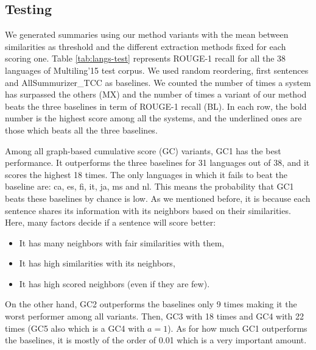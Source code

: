 \subsection{Testing}

We generated summaries using our method variants with the mean between similarities as threshold and the different extraction methods fixed for each scoring one.
Table \ref{tab:langs-test} represents ROUGE-1 recall for all the 38 languages of Multiling'15 test corpus. 
We used random reordering, first sentences and AllSummurizer\_TCC as baselines.
We counted the number of times a system has surpassed the others (MX) and the number of times a variant of our method beats the three baselines in term of ROUGE-1 recall (BL).
In each row, the bold number is the highest score among all the systems, and the underlined ones are those which beats all the three baselines. 

%
\begin{center}
	\small
\end{center}

Among all graph-based cumulative score (GC) variants, GC1 has the best performance. 
It outperforms the three baselines for 31 languages out of 38, and it scores the highest 18 times.
The only languages in which it fails to beat the baseline are: ca, es, fi, it, ja, ms and nl.
This means the probability that GC1 beats these baselines by chance is low.
As we mentioned before, it is because each sentence shares its information with its neighbors based on their similarities. 
Here, many factors decide if a sentence will score better:
\begin{itemize}
	\item It has many neighbors with fair similarities with them,
	\item It has high similarities with its neighbors,
	\item It has high scored neighbors (even if they are few).
\end{itemize}
On the other hand, GC2 outperforms the baselines only 9 times making it the worst performer among all variants. 
Then, GC3 with 18 times and GC4 with 22 times (GC5 also which is a GC4 with $ a=1 $).
As for how much GC1 outperforms the baselines, it is mostly of the order of 0.01 which is a very important amount.

